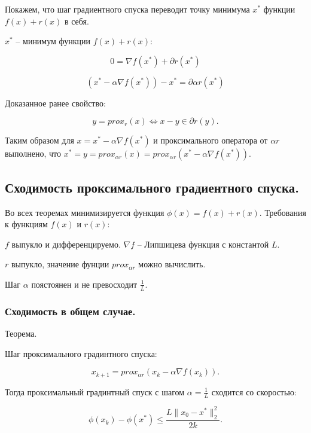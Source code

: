 Покажем, что шаг градиентного спуска переводит точку минимума $x^*$ функции $f(x)+r(x)$ в себя.

$x^*$ -- минимум функции $f(x)+r(x)$:

\begin{equation}
    0=\nabla f(x^*)+\partial r(x^*)
\end{equation}

\begin{equation}
    (x^*-\alpha\nabla f(x^*))-x^*=\partial\alpha r(x^*)
\end{equation}

Доказанное ранее свойство:

\begin{equation}
    y=prox_r(x)\iff x-y\in\partial r(y).
\end{equation}

Таким образом для $x=x^*-\alpha\nabla f(x^*)$ и проксимального оператора от $\alpha r$ выполнено, что $x^*=y=prox_{\alpha r}(x)=prox_{\alpha r}(x^*-\alpha\nabla f(x^*))$.

\subsection*{Сходимость проксимального градиентного спуска.}

Во всех теоремах минимизируется функция $\phi(x)=f(x)+r(x)$. Требования к функциям $f(x)$ и $r(x)$:

$f$ выпукло и дифференцируемо. $\nabla f$ -- Липшицева функция с константой $L$.

$r$ выпукло, значение фунции $prox_{\alpha r}$ можно вычислить.

Шаг $\alpha$ поястоянен и не превосходит $\frac1L$.

\subsubsection*{Сходимость в общем случае.}

Теорема.

Шаг проксимального градинтного спуска:

\begin{equation}
    x_{k+1}=prox_{\alpha r}(x_k-\alpha\nabla f(x_k)).
\end{equation}

Тогда проксимальный градинтный спуск с шагом $\alpha=\frac1L$ сходится со скоростью:

\begin{equation}
    \phi(x_k)-\phi(x^*)\leq\frac{L\|x_0-x^*\|_2^2}{2k}.
\end{equation}

